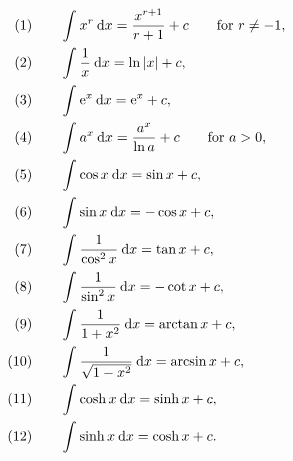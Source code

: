 \begin{properties}
\label{prop:bi}
\begin{equation*}
\begin{split}
(1) \qquad & \int_{}^{} x^r \: \mathrm{d} x = \frac{x^{r+1}}{r+1} + c \qquad \text{for~} r\not=-1,  \\
(2) \qquad & \int_{}^{} \frac{1}{x} \: \mathrm{d} x = \ln\left| x \right| + c, \\
(3) \qquad & \int_{}^{} \mathrm{e}^x \: \mathrm{d} x = \mathrm{e}^x + c, \\
(4) \qquad & \int_{}^{} a^x \: \mathrm{d} x = \frac{a^x}{\ln a} + c \qquad \text{for~} a>0,  \\
(5) \qquad & \int_{}^{} \cos x \: \mathrm{d} x = \sin x + c, \\
(6) \qquad & \int_{}^{} \sin x \: \mathrm{d} x = -\cos x + c, \\
(7) \qquad & \int_{}^{} \frac{1}{\cos^2 x} \: \mathrm{d} x = \tan x + c, \\
(8) \qquad & \int_{}^{} \frac{1}{\sin^2 x} \: \mathrm{d} x = -\cot x + c, \\
(9) \qquad & \int_{}^{} \frac{1}{1+x^2} \: \mathrm{d} x = \arctan x + c, \\
(10) \qquad & \int_{}^{} \frac{1}{\sqrt{1-x^2}} \: \mathrm{d} x = \arcsin x + c, \\
(11) \qquad & \int_{}^{} \cosh x \: \mathrm{d} x = \sinh x + c, \\
(12) \qquad & \int_{}^{} \sinh x \: \mathrm{d} x = \cosh x + c. 
\end{split}
\end{equation*}
\end{properties}

